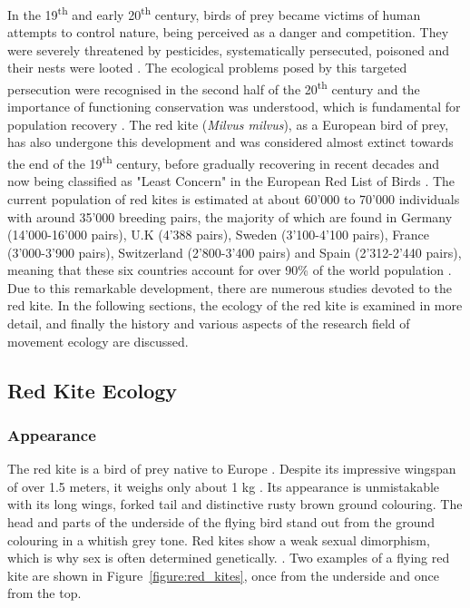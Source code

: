 In the 19\textsuperscript{th} and early 20\textsuperscript{th} century, birds of prey became victims of human attempts to control nature, being perceived as a danger and competition. They were severely threatened by pesticides, systematically persecuted, poisoned and their nests were looted \parencite{aebischer2021rotmilan, collar1988birds, ntampakis2005red}. The ecological problems posed by this targeted persecution were recognised in the second half of the 20\textsuperscript{th} century and the importance of functioning conservation was understood, which is fundamental for population recovery \parencite{aebischer2021rotmilan, seoane2003effects}. The red kite (\textit{Milvus milvus}), as a European bird of prey, has also undergone this development and was considered almost extinct towards the end of the 19\textsuperscript{th} century, before gradually recovering in recent decades and now being classified as "Least Concern" in the European Red List of Birds \parencite{birdlife2021redlist}. The current population of red kites is estimated at about 60'000 to 70'000 individuals with around 35'000 breeding pairs, the majority of which are found in Germany (14'000-16'000 pairs), U.K (4'388 pairs), Sweden (3'100-4'100 pairs), France (3'000-3'900 pairs), Switzerland (2'800-3'400 pairs) and Spain (2'312-2'440 pairs), meaning that these six countries account for over 90\% of the world population \parencite{birdlifefactsheet}. Due to this remarkable development, there are numerous studies devoted to the red kite. In the following sections, the ecology of the red kite is examined in more detail, and finally the history and various aspects of the research field of movement ecology are discussed.

\subsection{Red Kite Ecology}
\subsubsection{Appearance}
The red kite is a bird of prey native to Europe \parencite{garcia2022seasonal, literak2022disperal, panter2022age}. Despite its impressive wingspan of over 1.5 meters, it weighs only about 1 kg \parencite{aebischer2021rotmilan, ortlieb1989rotmilan}. Its appearance is unmistakable with its long wings, forked tail and distinctive rusty brown ground colouring. The head and parts of the underside of the flying bird stand out from the ground colouring in a whitish grey tone. Red kites show a weak sexual dimorphism, which is why sex is often determined genetically. \parencite{aebischer2021rotmilan}. Two examples of a flying red kite are shown in Figure~\ref{figure:red_kites}, once from the underside and once from the top.

